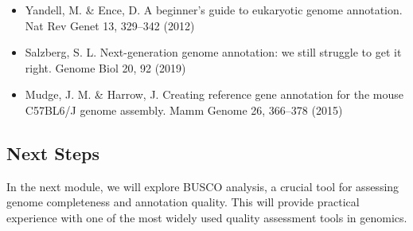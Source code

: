 \begin{itemize}
    \item Yandell, M. \& Ence, D. A beginner's guide to eukaryotic genome annotation. Nat Rev Genet 13, 329–342 (2012)
    \item Salzberg, S. L. Next-generation genome annotation: we still struggle to get it right. Genome Biol 20, 92 (2019)
    \item Mudge, J. M. \& Harrow, J. Creating reference gene annotation for the mouse C57BL6/J genome assembly. Mamm Genome 26, 366–378 (2015)
\end{itemize}

\subsection{Next Steps}

In the next module, we will explore BUSCO analysis, a crucial tool for assessing genome completeness and annotation quality. This will provide practical experience with one of the most widely used quality assessment tools in genomics.